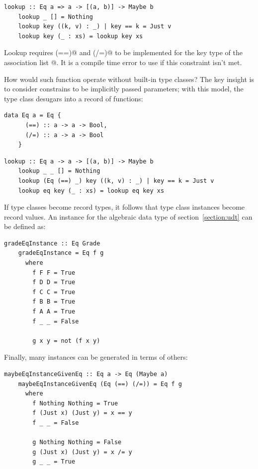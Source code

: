 \documentclass[UdineBachThesis,american,11pt,draft]{PhdThesis}
\begin{document}
  \begin{lstlisting}[gobble=4,basicstyle=\ttfamily\small]
    lookup :: Eq a => a -> [(a, b)] -> Maybe b
    lookup _ [] = Nothing
    lookup key ((k, v) : _) | key == k = Just v
    lookup key (_ : xs) = lookup key xs
  \end{lstlisting}

  Lookup requires \lstinline@(==)@ and \lstinline@(/=)@ to be implemented for
  the key type \lstinline@a@ of the association list \lstinline@[(a, b)]@. It is
  a compile time error to use \lstinline@lookup@ if this constraint isn't met.

  How would such function operate without built-in type classes? The key insight
  is to consider constrains to be implicitly passed parameters; with this model,
  the \lstinline@Eq@ type class desugars into a record of functions:

  \begin{lstlisting}[gobble=4,basicstyle=\ttfamily\small]
    data Eq a = Eq {
      (==) :: a -> a -> Bool,
      (/=) :: a -> a -> Bool
    }
  \end{lstlisting}

  \begin{lstlisting}[gobble=4,basicstyle=\ttfamily\small]
    lookup :: Eq a -> a -> [(a, b)] -> Maybe b
    lookup _ _ [] = Nothing
    lookup (Eq (==) _) key ((k, v) : _) | key == k = Just v
    lookup eq key (_ : xs) = lookup eq key xs
  \end{lstlisting}

  If type classes become record types, it follows that type class instances
  become record values. An \lstinline@Eq@ instance for the algebraic data type
  \lstinline@Grade@ of section~\ref{section:udt} can be defined as:

  \begin{lstlisting}[gobble=4,basicstyle=\ttfamily\small]
    gradeEqInstance :: Eq Grade
    gradeEqInstance = Eq f g
      where
        f F F = True
        f D D = True
        f C C = True
        f B B = True
        f A A = True
        f _ _ = False

        g x y = not (f x y)
  \end{lstlisting}

  Finally, many instances can be generated in terms of others:

  \begin{lstlisting}[gobble=4,basicstyle=\ttfamily\small]
    maybeEqInstanceGivenEq :: Eq a -> Eq (Maybe a)
    maybeEqInstanceGivenEq (Eq (==) (/=)) = Eq f g
      where
        f Nothing Nothing = True
        f (Just x) (Just y) = x == y
        f _ _ = False

        g Nothing Nothing = False
        g (Just x) (Just y) = x /= y
        g _ _ = True
  \end{lstlisting}
\end{document}
